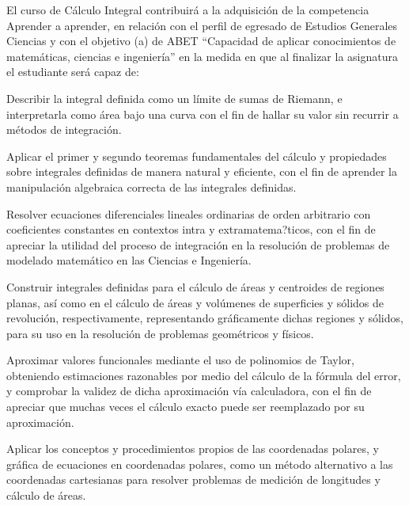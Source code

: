 \begin{syllabus}


\begin{justification}
El curso de Cálculo Integral contribuirá a la adquisición de la competencia Aprender a aprender, en relación con el perfil de egresado de Estudios Generales Ciencias y con el objetivo (a) de ABET ``Capacidad de aplicar conocimientos de matemáticas, ciencias e ingeniería'' en la medida en que al finalizar la asignatura el estudiante será capaz de:
\end{justification}

\begin{goals}
\item Describir la integral definida como un límite de sumas de Riemann, e interpretarla como área bajo una curva con el fin de hallar su valor sin recurrir a métodos de integración.
\item Aplicar el primer y segundo teoremas fundamentales del cálculo y propiedades sobre integrales definidas de manera natural y eficiente, con el fin de aprender la manipulación algebraica correcta de las integrales definidas.
\item Resolver ecuaciones diferenciales lineales ordinarias de orden arbitrario con coeficientes constantes en contextos intra y extramatema?ticos, con el fin de apreciar la utilidad del proceso de integración en la resolución de problemas de modelado matemático en las Ciencias e Ingeniería.
\item Construir integrales definidas para el cálculo de áreas y centroides de regiones planas, así como en el cálculo de áreas y volúmenes de superficies y sólidos de revolución, respectivamente, representando gráficamente dichas regiones y sólidos, para su uso en la resolución de problemas geométricos y físicos.
\item Aproximar valores funcionales mediante el uso de polinomios de Taylor, obteniendo estimaciones razonables por medio del cálculo de la fórmula del error, y comprobar la validez de dicha aproximación vía calculadora, con el fin de apreciar que muchas veces el cálculo exacto puede ser reemplazado por su aproximación.
\item Aplicar los conceptos y procedimientos propios de las coordenadas polares, y gráfica de ecuaciones en coordenadas polares, como un método alternativo a las coordenadas cartesianas para resolver problemas de medición de longitudes y cálculo de áreas.


\end{goals}
\end{syllabus}
